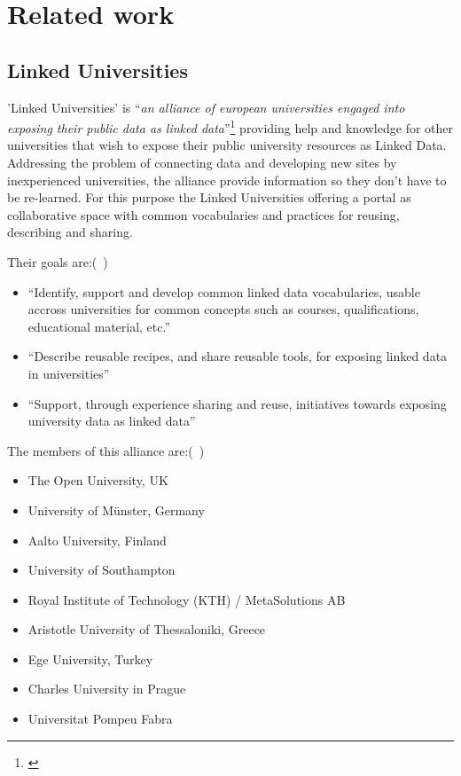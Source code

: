 \documentclass{article}
\begin{document}

\section{Related work}
\label{related-work}


\subsection{Linked Universities}
\label{related-work:linked-universities}
'Linked Universities' is "`\textit{an alliance of european universities engaged into exposing their public data as linked data}"'\footnote{\cite{daquin_linked_2014}} providing help and knowledge for other universities that wish to expose their public university resources as Linked Data. Addressing the problem of connecting data and developing new sites by inexperienced universities, the alliance provide information so they don't have to be re-learned. For this purpose the Linked Universities offering a portal as collaborative space with common vocabularies and practices for reusing, describing and sharing.

Their goals are:(~\cite{daquin_linked_2014})

\begin{itemize}
\item "`Identify, support and develop common linked data vocabularies, usable accross universities for common concepts such as courses, qualifications, educational material, etc."'
\item "`Describe reusable recipes, and share reusable tools, for exposing linked data in universities"'
\item "`Support, through experience sharing and reuse, initiatives towards exposing university data as linked data"'
\end{itemize}

The members of this alliance are:(~\cite{daquin_members_2014})
\begin{itemize}
	\item The Open University, UK
	\item University of Münster, Germany
	\item Aalto University, Finland
	\item University of Southampton
	\item Royal Institute of Technology (KTH) / MetaSolutions AB
	\item Aristotle University of Thessaloniki, Greece
	\item Ege University, Turkey
	\item Charles University in Prague
	\item Universitat Pompeu Fabra
\end{itemize}
\end{document}
